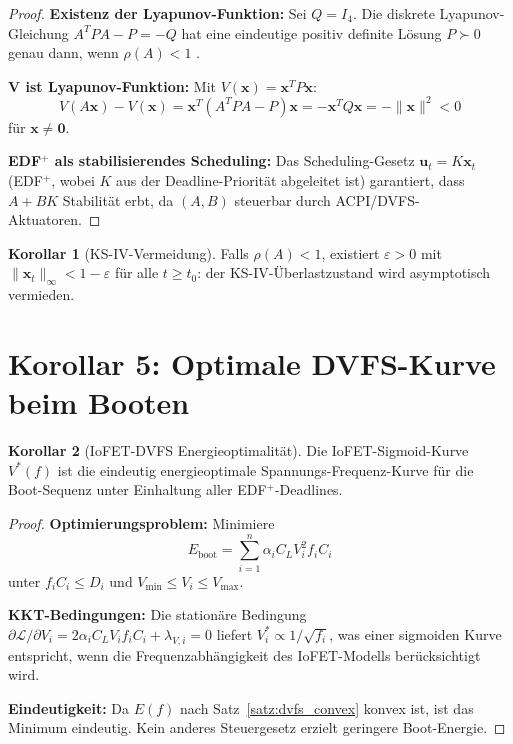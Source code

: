 ﻿\documentclass[a4paper,12pt]{scrreprt}
\theoremstyle{definition}
\newtheorem{korollar}{Korollar}[chapter]
\begin{document}
	\begin{proof}
		\textbf{Existenz der Lyapunov-Funktion:} Sei $Q = I_4$. Die diskrete
		Lyapunov-Gleichung $A^T P A - P = -Q$ hat eine eindeutige positiv
		definite Lösung $P \succ 0$ genau dann, wenn $\rho(A) < 1$
		\cite{Khalil2002}.
		
		\textbf{V ist Lyapunov-Funktion:} Mit $V(\mathbf{x}) = \mathbf{x}^T P \mathbf{x}$:
		\[
		V(A\mathbf{x}) - V(\mathbf{x})
		= \mathbf{x}^T(A^T P A - P)\mathbf{x}
		= -\mathbf{x}^T Q \mathbf{x}
		= -\|\mathbf{x}\|^2 < 0
		\]
		für $\mathbf{x} \neq \mathbf{0}$.
		
		\textbf{EDF$^+$ als stabilisierendes Scheduling:} Das Scheduling-Gesetz
		$\mathbf{u}_t = K \mathbf{x}_t$ (EDF$^+$, wobei $K$ aus der
		Deadline-Priorität abgeleitet ist) garantiert, dass $A + BK$
		Stabilität erbt, da $(A, B)$ steuerbar durch ACPI/DVFS-Aktuatoren.
	\end{proof}
	
	\begin{korollar}[KS-IV-Vermeidung]
		Falls $\rho(A) < 1$, existiert $\varepsilon > 0$ mit
		$\|\mathbf{x}_t\|_\infty < 1 - \varepsilon$ für alle $t \geq t_0$:
		der KS-IV-Überlastzustand wird asymptotisch vermieden.
	\end{korollar}
	
	\section{Korollar 5: Optimale DVFS-Kurve beim Booten}
	
	\begin{korollar}[IoFET-DVFS Energieoptimalität]\label{kor:dvfs_opt}
		Die IoFET-Sigmoid-Kurve $V^*(f)$ ist die eindeutig energieoptimale
		Spannungs-Frequenz-Kurve für die Boot-Sequenz unter Einhaltung aller
		EDF$^+$-Deadlines.
	\end{korollar}
	
	\begin{proof}
		\textbf{Optimierungsproblem:} Minimiere
		\[
		E_{\mathrm{boot}} = \sum_{i=1}^{n} \alpha_i C_L V_i^2 f_i C_i
		\]
		unter $f_i C_i \leq D_i$ und $V_{\min} \leq V_i \leq V_{\max}$.
		
		\textbf{KKT-Bedingungen:} Die stationäre Bedingung
		$\partial \mathcal{L}/\partial V_i = 2\alpha_i C_L V_i f_i C_i + \lambda_{V,i} = 0$
		liefert $V_i^* \propto 1/\sqrt{f_i}$, was einer sigmoiden Kurve
		entspricht, wenn die Frequenzabhängigkeit des IoFET-Modells berücksichtigt wird.
		
		\textbf{Eindeutigkeit:} Da $E(f)$ nach Satz~\ref{satz:dvfs_convex}
		konvex ist, ist das Minimum eindeutig. Kein anderes Steuergesetz
		erzielt geringere Boot-Energie.
	\end{proof}
	
\end{document}
